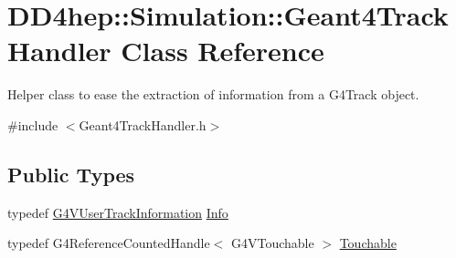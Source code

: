 \hypertarget{class_d_d4hep_1_1_simulation_1_1_geant4_track_handler}{}\section{D\+D4hep\+:\+:Simulation\+:\+:Geant4\+Track\+Handler Class Reference}
\label{class_d_d4hep_1_1_simulation_1_1_geant4_track_handler}


Helper class to ease the extraction of information from a G4\+Track object.  




{\ttfamily \#include $<$Geant4\+Track\+Handler.\+h$>$}

\subsection*{Public Types}
\begin{DoxyCompactItemize}
\item 
typedef \hyperlink{class_g4_v_user_track_information}{G4\+V\+User\+Track\+Information} \hyperlink{class_d_d4hep_1_1_simulation_1_1_geant4_track_handler_a0db29f37f6c64822f75c656ac27c03b4}{Info}
\item 
typedef G4\+Reference\+Counted\+Handle$<$ G4\+V\+Touchable $>$ \hyperlink{class_d_d4hep_1_1_simulation_1_1_geant4_track_handler_a7db438397a8ccd838ba7bf5fe1b75bdb}{Touchable}
\end{DoxyCompactItemize}
